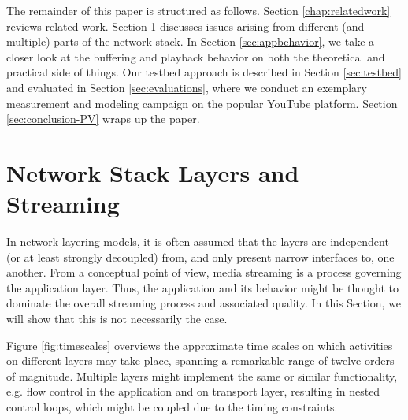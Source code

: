 The remainder of this paper is structured as follows. Section \ref{chap:relatedwork} reviews related work. Section \ref{sec:analysis} discusses issues arising from different (and multiple) parts of the network stack. In Section \ref{sec:appbehavior}, we take a closer look at the buffering and playback behavior on both the theoretical and practical side of things. Our testbed approach is described in Section \ref{sec:testbed} and evaluated in Section \ref{sec:evaluations}, where we conduct an exemplary measurement and modeling campaign on the popular YouTube platform. Section \ref{sec:conclusion-PV} wraps up the paper.





\section{Network Stack Layers and Streaming}
\label{sec:analysis}

In network layering models, it is often assumed that the layers are independent (or at least strongly decoupled) from, and only present narrow interfaces to, one another. From a conceptual point of view, media streaming is a process governing the application layer. Thus, the application and its behavior might be thought to dominate the overall streaming process and associated quality. In this Section, we will show that this is not necessarily the case. %


Figure \ref{fig:timescales} overviews the approximate time scales on which activities on different layers may take place, spanning a remarkable range of twelve orders of magnitude. Multiple layers might implement the same or similar functionality, e.g. flow control in the application and on transport layer, resulting in nested control loops, which might be coupled due to the timing constraints. 




